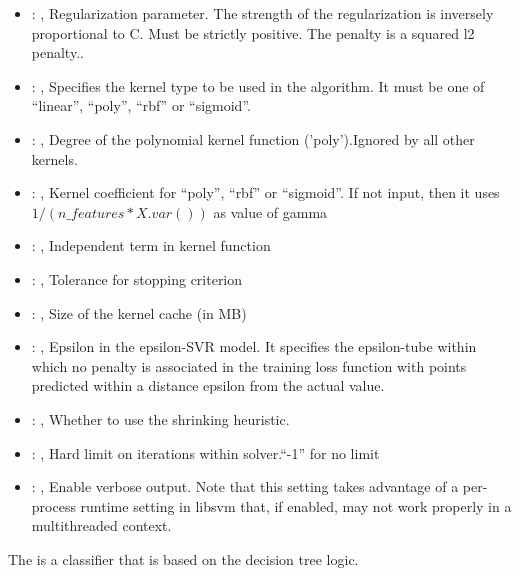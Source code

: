 \begin{itemize}
    \item {}: , 
      Regularization parameter. The strength of the regularization is inversely
      proportional to C.                                                            Must be strictly
      positive. The penalty is a squared l2 penalty..

    \item {}: , 
      Specifies the kernel type to be used in the algorithm. It must be one of
      ``linear'', ``poly'', ``rbf'' or ``sigmoid''.

    \item {}: , 
      Degree of the polynomial kernel function ('poly').Ignored by all other kernels.

    \item {}: , 
      Kernel coefficient for ``poly'', ``rbf'' or ``sigmoid''. If not input, then it uses
      $1 / (n\_features * X.var())$ as value of gamma

    \item {}: , 
      Independent term in kernel function

    \item {}: , 
      Tolerance for stopping criterion

    \item {}: , 
      Size of the kernel cache (in MB)

    \item {}: , 
      Epsilon in the epsilon-SVR model. It specifies the epsilon-tube
      within which no penalty is associated in the training loss function
      with points predicted within a distance epsilon from the actual
      value.

    \item {}: , 
      Whether to use the shrinking heuristic.

    \item {}: , 
      Hard limit on iterations within solver.``-1'' for no limit

    \item {}: , 
      Enable verbose output. Note that this setting takes advantage
      of a per-process runtime setting in libsvm that, if enabled, may not
      work properly in a multithreaded context.
  \end{itemize}
 The  is a classifier that is based on the
 decision tree logic.                          

